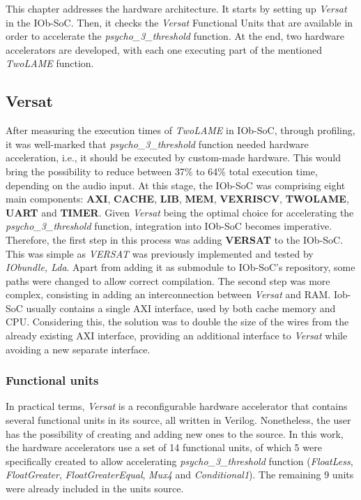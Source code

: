 \documentclass{article}
\begin{document}
This chapter addresses the hardware architecture. It starts by setting up \textit{Versat} in the IOb-SoC. Then, it checks the \textit{Versat} Functional Units that are available in order to accelerate the \textit{psycho\_3\_threshold} function. At the end, two hardware accelerators are developed, with each one executing part of the mentioned \textit{TwoLAME} function.

\subsection{Versat}

After measuring the execution times of \textit{TwoLAME} in IOb-SoC, through profiling, it was well-marked that \textit{psycho\_3\_threshold} function needed hardware acceleration, i.e., it should be executed by custom-made hardware. This would bring the possibility to reduce between 37\% to 64\% total execution time, depending on the audio input.
At this stage, the IOb-SoC was comprising eight main components: \textbf{AXI}, \textbf{CACHE}, \textbf{LIB}, \textbf{MEM}, \textbf{VEXRISCV}, \textbf{TWOLAME}, \textbf{UART} and \textbf{TIMER}. Given \textit{Versat} being the optimal choice for accelerating the \textit{psycho\_3\_threshold} function, integration into IOb-SoC becomes imperative.
Therefore, the first step in this process was adding \textbf{VERSAT} to the IOb-SoC. This was simple as \textit{VERSAT} was previously implemented and tested by \textit{IObundle, Lda}. Apart from adding it as submodule to IOb-SoC's repository, some paths were changed to allow correct compilation.
The second step was more complex, consisting in adding an interconnection between \textit{Versat} and RAM. Iob-SoC usually contains a single AXI interface, used by both cache memory and CPU. Considering this, the solution was to double the size of the wires from the already existing AXI interface, providing an additional interface to \textit{Versat} while avoiding a new separate interface.

\subsubsection{Functional units}
In practical terms, \textit{Versat} is a reconfigurable hardware accelerator that contains several functional units in its source, all written in Verilog. Nonetheless, the user has the possibility of creating and adding new ones to the source.
In this work, the hardware accelerators use a set of 14 functional units, of which 5 were specifically created to allow accelerating \textit{psycho\_3\_threshold} function (\textit{FloatLess}, \textit{FloatGreater}, \textit{FloatGreaterEqual}, \textit{Mux4} and \textit{Conditional1}). The remaining 9 units were already included in the units source.
\end{document}

